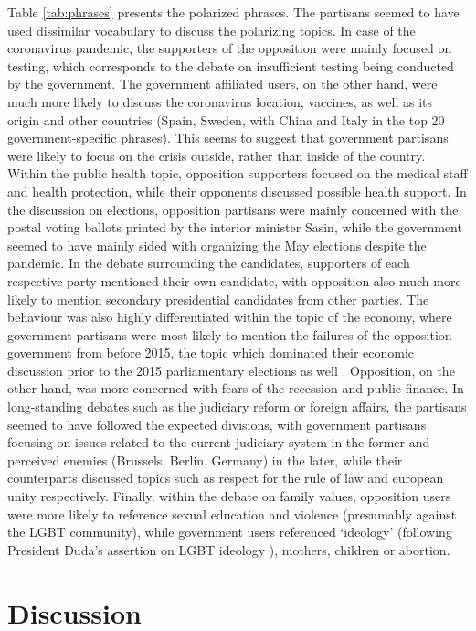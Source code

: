 \documentclass{article}
\begin{document}
	
	Table \ref{tab:phrases} presents the polarized phrases. The partisans seemed to have used dissimilar vocabulary to discuss the polarizing topics. In case of the coronavirus pandemic, the supporters of the opposition were mainly focused on testing, which corresponds to the debate on insufficient testing being conducted by the government. The government affiliated users, on the other hand, were much more likely to discuss the coronavirus location, vaccines, as well as its origin and other countries (Spain, Sweden, with China and Italy in the top 20 government-specific phrases). This seems to suggest that government partisans were likely to focus on the crisis outside, rather than inside of the country. Within the public health topic, opposition supporters focused on the medical staff and health protection, while their opponents discussed possible health support. In the discussion on elections, opposition partisans were mainly concerned with the postal voting ballots printed by the interior minister Sasin, while the government seemed to have mainly sided with organizing the May elections despite the pandemic. In the debate surrounding the candidates, supporters of each respective party mentioned their own candidate, with opposition also much more likely to mention secondary presidential candidates from other parties. The behaviour was also highly differentiated within the topic of the economy, where government partisans were most likely to mention the failures of the opposition government from before 2015, the topic which dominated their economic discussion prior to the 2015 parliamentary elections as well \citep{matuszewski2018}. Opposition, on the other hand, was more concerned with fears of the recession and public finance. In long-standing debates such as the judiciary reform or foreign affairs,  the partisans seemed to have followed the expected divisions, with government partisans focusing on issues related to the current judiciary system in the former and perceived enemies (Brussels, Berlin, Germany) in the later, while their counterparts discussed topics such as respect for the rule of law and european unity respectively. Finally, within the debate on family values, opposition users were more likely to reference sexual education and violence (presumably against the LGBT community), while government users referenced ‘ideology’ (following President Duda’s assertion on LGBT ideology \citep{financial_times2020}), mothers, children or abortion.
	
	\clearpage
	
	
	\section*{Discussion}
	
\end{document}

